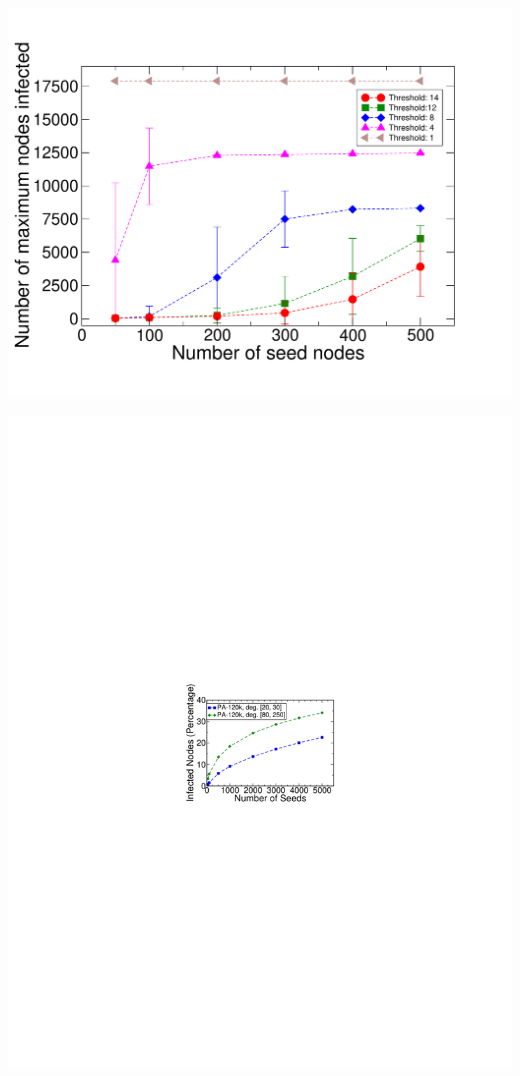 \documentclass[landscape,paperwidth=70in,paperheight=46in,fontscale=0.225]{baposter} %
\begin{document}
\begin{poster}
{\begin{minipage}{0.5\linewidth}
\centering
\includegraphics[trim = 0in 0in 0in 0.4in, clip, scale=0.16]{figures/astroph_threshold_cs.pdf} 
\end{minipage}
\hfill
\begin{minipage}{0.5\linewidth}
\centering
\includegraphics[trim = 0in 0in 0in 0.2in, clip, scale=0.6]{figures/clustering_seed.pdf} 

\end{minipage}}
\end{poster}
\end{document}
